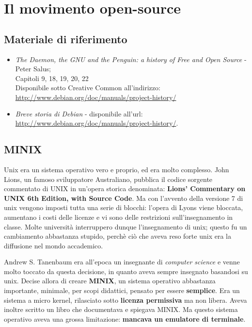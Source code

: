 \section{Il movimento open-source}

\subsection{Materiale di riferimento}

\begin{itemize}

\item \textit{The Daemon, the GNU and the Penguin: a history of Free and Open Source} - Peter Salus;\\
Capitoli 9, 18, 19, 20, 22 \\
Disponibile sotto Creative Common all'indirizzo: \url{http://www.debian.org/doc/manuals/project-history/}
\item \textit{Breve storia di Debian} - disponibile all'url: \url{http://www.debian.org/doc/manuals/project-history/}.

\end{itemize}

\subsection{MINIX}

Unix era un sistema operativo vero e proprio, ed era molto complesso. John Lions, un famoso sviluppatore Australiano, pubblica il codice sorgente commentato di UNIX in un'opera storica denominata: \textbf{Lions' Commentary on UNIX 6th Edition, with Source Code}. Ma con l'avvento della versione 7 di unix vengono imposti tutta una serie di blocchi: l'opera di Lyons viene bloccata, aumentano i costi delle licenze e vi sono delle restrizioni sull'insegnamento in classe. Molte università interruppero dunque l'insegnamento di unix; questo fu un cambiamento abbastanza stupido, perchè ciò che aveva reso forte unix era la diffusione nel mondo accademico. 

Andrew S. Tanenbaum era all'epoca un insegnante di \textit{computer science} e venne molto toccato da questa decisione, in quanto aveva sempre insegnato basandosi su unix. Decise allora di creare \textbf{MINIX}, un sistema operativo abbastanza importante, minimale, per scopi didattici, pensato per essere \textbf{semplice}. Era un sistema a micro kernel, rilasciato sotto \textbf{licenza permissiva} ma non libera. Aveva inoltre scritto un libro che documentava e spiegava MINIX. Ma questo sistema operativo aveva una grossa limitazione: \textbf{mancava un emulatore di terminale}.

